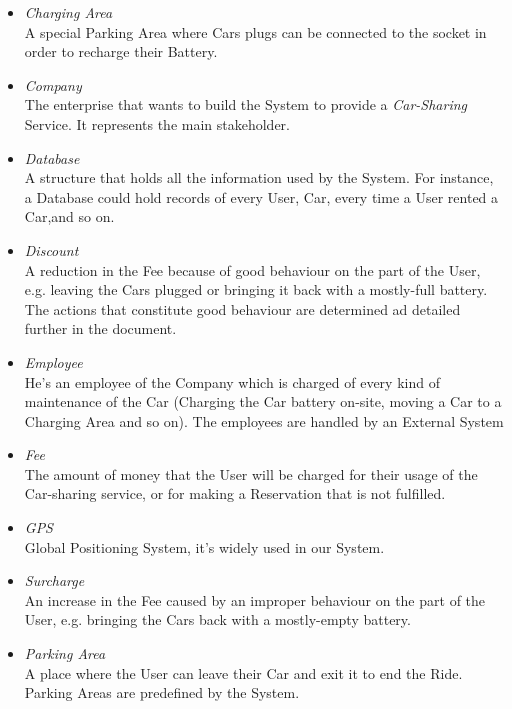 \begin{itemize}
	\item \emph{Charging Area} \\		
	A special Parking Area where Cars plugs can be connected to the socket in order to recharge their Battery.	

	\item \emph{Company} \\
	The enterprise that wants to build the System to provide a \textit{Car-Sharing} Service. It represents the main stakeholder.	
	
	\item \emph{Database} \\
	A structure that holds all the information used by the System. For instance, a Database could hold records of every User, Car, every time a User rented a Car,and so on.

	\item \emph{Discount} \\
	A reduction in the Fee because of good behaviour on the part of the User, e.g. leaving the Cars plugged or bringing it back with a mostly-full battery. The actions that constitute good behaviour are determined ad detailed further in the document.

	\item \emph{Employee}\\
	He's an employee of the Company which is charged of every kind of maintenance of the Car (Charging the Car battery on-site, moving a Car to a Charging Area and so on). The employees are handled by an External System

	\item \emph{Fee}\\
	The amount of money that the User will be charged for their usage of the Car-sharing service, or for making a Reservation that is not fulfilled.

	\item \emph{GPS}\\
	Global Positioning System, it's widely used in our System.

	\item \emph{Surcharge}\\
	An increase in the Fee caused by an improper behaviour on the part of the User, e.g. bringing the Cars back with a mostly-empty battery.

	\item \emph{Parking Area}\\
	A place where the User can leave their Car and exit it to end the Ride. Parking Areas are predefined by the System.


\end{itemize}
